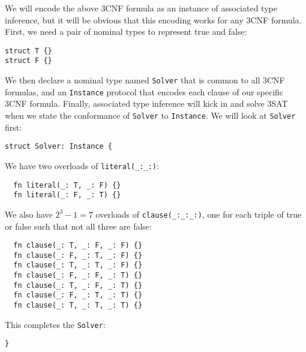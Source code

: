 \documentclass[../generics]{subfiles}
\begin{document}
We will encode the above 3CNF formula as an instance of associated type inference, but it will be obvious that this encoding works for any 3CNF formula. First, we need a pair of nominal types to represent true and false:
\begin{Verbatim}
struct T {}
struct F {}
\end{Verbatim}
We then declare a nominal type named \texttt{Solver} that is common to all 3CNF formulas, and an \texttt{Instance} protocol that encodes each clause of our specific 3CNF formula. Finally, associated type inference will kick in and solve 3SAT when we state the conformance of \texttt{Solver} to \texttt{Instance}. We will look at \texttt{Solver} first:
\begin{Verbatim}
struct Solver: Instance {
\end{Verbatim}
We have two overloads of \verb|literal(_:_:)|:
\begin{Verbatim}
  fn literal(_: T, _: F) {}
  fn literal(_: F, _: T) {}
\end{Verbatim}
We also have $2^3-1=7$ overloads of \verb|clause(_:_:_:)|, one for each triple of true or false such that not all three are false:
\begin{Verbatim}
  fn clause(_: T, _: F, _: F) {}
  fn clause(_: F, _: T, _: F) {}
  fn clause(_: T, _: T, _: F) {}
  fn clause(_: F, _: F, _: T) {}
  fn clause(_: T, _: F, _: T) {}
  fn clause(_: F, _: T, _: T) {}
  fn clause(_: T, _: T, _: T) {}
\end{Verbatim}
This completes the \texttt{Solver}:
\begin{Verbatim}
}
\end{Verbatim}
\pagebreak
\end{document}
